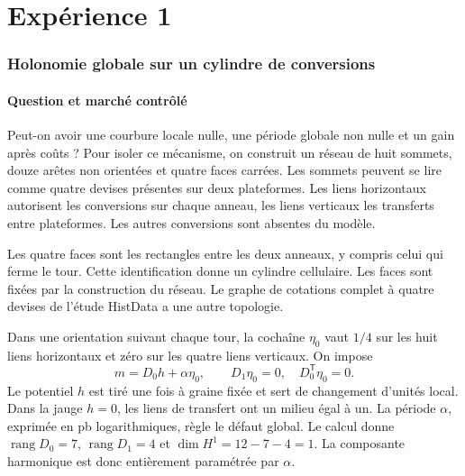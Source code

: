 \clearpage
\part{Expérience 1}
\section{Holonomie globale sur un cylindre de conversions}
\label{sec:experience-un}

\subsection{Question et marché contrôlé}

Peut-on avoir une courbure locale nulle, une période globale non nulle et un gain après coûts ? Pour isoler ce mécanisme, on construit un réseau de huit sommets, douze arêtes non orientées et quatre faces carrées. Les sommets peuvent se lire comme quatre devises présentes sur deux plateformes. Les liens horizontaux autorisent les conversions sur chaque anneau, les liens verticaux les transferts entre plateformes. Les autres conversions sont absentes du modèle.

\begin{center}
\end{center}

Les quatre faces sont les rectangles entre les deux anneaux, y compris celui qui ferme le tour. Cette identification donne un cylindre cellulaire. Les faces sont fixées par la construction du réseau. Le graphe de cotations complet à quatre devises de l'étude HistData a une autre topologie.

Dans une orientation suivant chaque tour, la cochaîne \(\eta_0\) vaut \(1/4\) sur les huit liens horizontaux et zéro sur les quatre liens verticaux. On impose
\[
 m=D_0h+\alpha\eta_0,\qquad
 D_1\eta_0=0,\quad D_0^{\mathsf T}\eta_0=0 .
\]
Le potentiel \(h\) est tiré une fois à graine fixée et sert de changement d'unités local. Dans la jauge \(h=0\), les liens de transfert ont un milieu égal à un. La période \(\alpha\), exprimée en pb logarithmiques, règle le défaut global. Le calcul donne \(\operatorname{rang}D_0=7\), \(\operatorname{rang}D_1=4\) et
\(\dim H^1=12-7-4=1\). La composante harmonique est donc entièrement paramétrée par \(\alpha\).

